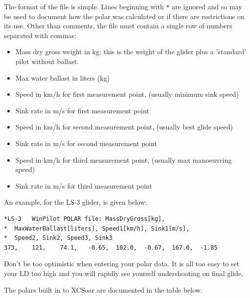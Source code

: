 \documentclass[a4paper,12pt]{refrep}
\begin{document}
The format of the file is simple.  Lines beginning with \verb|*| are
ignored and so may be used to document how the polar was calculated or
if there are restrictions on its use.  Other than comments, the file
must contain a single row of numbers separated with commas:
\begin{itemize}
\item Mass dry gross weight in kg: this is the weight of the glider plus
  a 'standard' pilot without ballast.
\item Max water ballast in liters (kg)
\item Speed in km/h for first measurement point, (usually minimum sink speed)
\item Sink rate in m/s for first measurement point
\item Speed in km/h for second measurement point, (usually best glide speed)
\item Sink rate in m/s for second measurement point
\item Speed in km/h for third measurement point, (usually max manoeuvring speed)
\item Sink rate in m/s for third measurement point
\end{itemize}

An example, for the LS-3 glider, is given below:
\begin{verbatim}
*LS-3	WinPilot POLAR file: MassDryGross[kg], 
*  MaxWaterBallast[liters], Speed1[km/h], Sink1[m/s], 
*  Speed2, Sink2, Speed3, Sink3  	
373,	121,	74.1,	-0.65,	102.0,	-0.67,	167.0,	-1.85
\end{verbatim}

\tip Don't be too optimistic when entering your polar data. It is all too
easy to set your LD too high and you will rapidly see yourself
undershooting on final glide.

The polars built in to XCSoar are documented in the table below.
\end{document}
